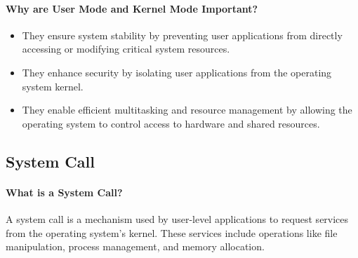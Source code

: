 \paragraph{Why are User Mode and Kernel Mode Important?}
\begin{itemize}
    \item They ensure system stability by preventing user applications from directly accessing or modifying critical system resources.
    \item They enhance security by isolating user applications from the operating system kernel.
    \item They enable efficient multitasking and resource management by allowing the operating system to control access to hardware and shared resources.
\end{itemize}





\subsection{System Call}


\paragraph{What is a System Call?}
A system call is a mechanism used by user-level applications to request services from the operating system's kernel. These services include operations like file manipulation, process management, and memory allocation.


